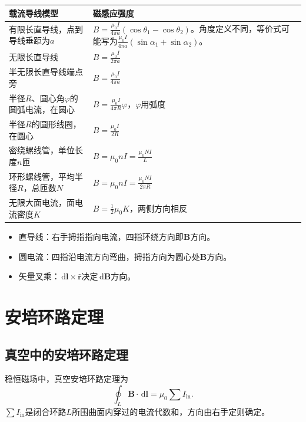 \documentclass[UTF8,zihao=-4]{ctexart}
\newcommand{\dd}{\,\mathrm d}
\newcommand{\muz}{\mu_0}
\newcommand{\ve}[1]{\bm{#1}}
\newcommand{\B}{\ve B}
\newcommand{\dl}{\dd\ve l}
\begin{document}
\begin{longtable}{>{\raggedright\arraybackslash}p{}>{\raggedright\arraybackslash}p{}}
\toprule
\textbf{载流导线模型} & \textbf{磁感应强度} \\
\midrule
有限长直导线，点到导线垂距为\(a\) & \(\displaystyle B=\frac{\muz I}{4\pi a}(\cos\theta_1-\cos\theta_2)\)。角度定义不同，等价式可能写为\(\displaystyle \frac{\muz I}{4\pi a}(\sin\alpha_1+\sin\alpha_2)\)。 \\
无限长直导线 & \(\displaystyle B=\frac{\muz I}{2\pi a}\) \\
半无限长直导线端点旁 & \(\displaystyle B=\frac{\muz I}{4\pi a}\) \\
半径\(R\)、圆心角\(\varphi\)的圆弧电流，在圆心 & \(\displaystyle B=\frac{\muz I}{4\pi R}\varphi\)，\(\varphi\)用弧度 \\
半径\(R\)的圆形线圈，在圆心 & \(\displaystyle B=\frac{\muz I}{2R}\) \\
密绕螺线管，单位长度\(n\)匝 & \(\displaystyle B=\muz nI=\frac{\muz NI}{L}\) \\
环形螺线管，平均半径\(R\)，总匝数\(N\) & \(\displaystyle B=\muz nI=\frac{\muz NI}{2\pi R}\) \\
无限大面电流，面电流密度\(K\) & \(\displaystyle B=\frac12\muz K\)，两侧方向相反 \\
\bottomrule
\end{longtable}

\begin{methodbox}[磁场方向判断]
\begin{itemize}
  \item 直导线：右手拇指指向电流，四指环绕方向即\(\B\)方向。
  \item 圆电流：四指沿电流方向弯曲，拇指方向为圆心处\(\B\)方向。
  \item 矢量叉乘：\(\dd\ve l\times \hat{\ve r}\)决定\(\dd\B\)方向。
\end{itemize}
\end{methodbox}

\section{安培环路定理}

\subsection{真空中的安培环路定理}

稳恒磁场中，真空安培环路定理为
\begin{equation}
\boxed{\oint_L \B\cdot\dl=\muz\sum I_{\mathrm{in}}}.
\end{equation}
\(\sum I_{\mathrm{in}}\)是闭合环路\(L\)所围曲面内穿过的电流代数和，方向由右手定则确定。
\end{document}
